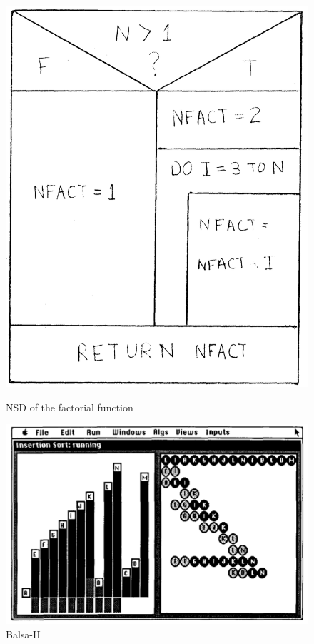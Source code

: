 \begin{figure}[ht]
  \centering
    \includegraphics[width=0.8\linewidth]{Nassi1973_NSD.png}
    \caption{NSD of the factorial function}
    \label{fig:Nassi1973_NSD}
  \endminipage\hfill
    \centering
    \includegraphics[width=\linewidth]{Brown1988_BalsaII.png}
    \caption{Balsa-II}
    \label{fig:BalsaII}
  \endminipage\hfill
    \centering

\end{figure}
